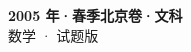 \documentclass[zihao=-4, a4paper]{ctexart}
\begin{document}
\begin{center}
  {\Large\bfseries 2005 年·春季北京卷·文科}\\[4pt]
  {\large 数学 · 试题版}
\end{center}
\medskip
{}

\end{document}
